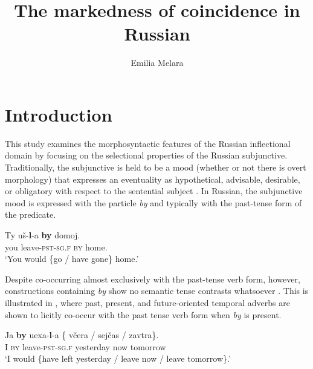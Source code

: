 \documentclass[output=paper,
modfonts,
newtxmath,
hidelinks,
]{langscibook}
\title{The markedness of coincidence in Russian}
\author{%
 Emilia Melara\affiliation{University of Toronto}
}
\begin{document}
\maketitle
{}



\section{Introduction}\label{s1}


This study examines the morphosyntactic features of the Russian inflectional domain by focusing on the selectional properties of the Russian subjunctive. Traditionally, the subjunctive is held to be a mood (whether or not there is overt morphology) that expresses an eventuality as hypothetical, advisable, desirable, or obligatory with respect to the sentential subject  \citep[142]{HarrisonLeFleming2000}. In Russian, the subjunctive mood is expressed with the particle \textit{by} and typically with the past-tense form of the predicate.

\ea \label{ex1}
\gll Ty uš-\textbf{l}{}-a \textbf{by} domoj.\\
     you leave\textsc{-pst-sg.f} \textsc{by} home.\\
\glt `You would \{go / have gone\} home.' \hfill \citep[152]{Mezhevich2006}
\z

\noindent Despite co-occurring almost exclusively with the past-tense verb form, however, constructions containing \textit{by} show no semantic tense contrasts whatsoever \citep[298]{Spencer2001}. This is illustrated in , where past, present, and future-oriented temporal adverbs are shown to licitly co-occur with the past tense verb form when \textit{by} is present. 

\ea \label{ex2}
\gll Ja \textbf{by} uexa-\textbf{l}{}-a \{\hspace{-2pt} včera / sejčas / zavtra\}.\\
     I \textsc{by} leave\textsc{-pst-sg.f} {} yesterday {} now {} tomorrow\\
\glt `I would \{have left yesterday / leave now / leave tomorrow\}.'\\
\hfill \citep[136]{Mezhevich2006}
\z
\end{document}
